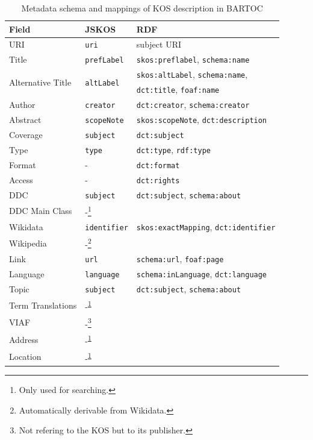 \documentclass[12pt,a4paper]{llncs}
\begin{document}
\begin{table}\centering
\caption{Metadata schema and mappings of KOS description in BARTOC}
\label{table:fields}
\begin{tabular}{lll}
Field & JSKOS & RDF \\
\hline	
URI      & \verb|uri|       & subject URI \\
Title    & \verb|prefLabel| & \verb|skos:preflabel|, \verb|schema:name| \\
\multirow{2}{*}{Alternative Title} &
\multirow{2}{*}{\texttt{altLabel}} 
 							& \verb|skos:altLabel|, \verb|schema:name|, \\
                          & & \verb|dct:title|, \verb|foaf:name| \\
Author   & \verb|creator|   & \verb|dct:creator|, \verb|schema:creator| \\
Abstract & \verb|scopeNote| & \verb|skos:scopeNote|, \verb|dct:description| \\
Coverage & \verb|subject|   & \verb|dct:subject| \\
Type     & \verb|type|      & \verb|dct:type|, \verb|rdf:type| \\
Format   & -				&  \verb|dct:format| \\
Access   & - 				& \verb|dct:rights| \\
DDC      & \verb|subject|   & \verb|dct:subject|, \verb|schema:about| \\
DDC Main Class & -\footnote{\label{fn:s}Only used for searching.} \\
Wikidata & \verb|identifier| & \verb|skos:exactMapping|, \verb|dct:identifier| \\
Wikipedia & -\footnote{Automatically derivable from Wikidata.} \\
Link     & \verb|url|       & \verb|schema:url|, \verb|foaf:page| \\
Language & \verb|language|  & \verb|schema:inLanguage|, \verb|dct:language| \\
Topic    & \verb|subject| & \verb|dct:subject|, \verb|schema:about| \\
Term Translations  & -\textsuperscript{\ref{fn:s}} \\
VIAF & -\footnote{\label{fn:p}Not refering to the KOS but to its publisher.} \\
Address & -\textsuperscript{\ref{fn:p}} \\
Location & -\textsuperscript{\ref{fn:p}} \\
\end{tabular}
\end{table}
\end{document}
